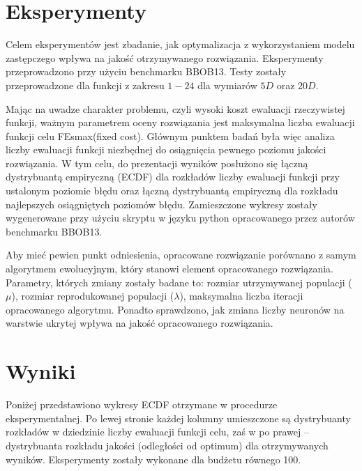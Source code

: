 \documentclass[runningheads]{llncs}
\begin{document}
\section{Eksperymenty}
Celem eksperymentów jest zbadanie, jak optymalizacja z wykorzystaniem modelu 
zastępczego wpływa na jakość otrzymywanego rozwiązania. Eksperymenty 
przeprowadzono przy użyciu benchmarku BBOB13. Testy zostały przeprowadzone dla 
funkcji z zakresu $1-24$ dla wymiarów $5D$ oraz $20D$. 

Mając na uwadze charakter problemu, czyli wysoki koszt ewaluacji rzeczywistej 
funkcji, ważnym parametrem oceny rozwiązania jest maksymalna liczba ewaluacji 
funkcji celu FEsmax(fixed cost). Głównym punktem badań była więc analiza liczby 
ewaluacji funkcji niezbędnej do osiągnięcia pewnego poziomu jakości 
rozwiązania. W tym celu, do prezentacji wyników posłużono się łączną 
dystrybuantą empiryczną (ECDF) dla rozkładów liczby ewaluacji funkcji przy 
ustalonym poziomie błędu oraz łączną dystrybuantą empiryczną dla rozkładu 
najlepszych osiągniętych poziomów błędu. Zamieszczone wykresy zostały 
wygenerowane przy użyciu skryptu w języku python opracowanego przez autorów 
benchmarku BBOB13.

Aby mieć pewien punkt odniesienia, opracowane rozwiązanie porównano z 
samym algorytmem ewolucyjnym, który stanowi element opracowanego rozwiązania. 
Parametry, których zmiany zostały badane to: rozmiar utrzymywanej populacji 
($\mu$), rozmiar reprodukowanej populacji ($\lambda$), maksymalna liczba 
iteracji opracowanego algorytmu. Ponadto sprawdzono, jak zmiana liczby 
neuronów na warstwie ukrytej wpływa na jakość opracowanego rozwiązania.

\section{Wyniki}
\newcommand{\rot}[2][2.5]{
  \hspace*{-3.5\baselineskip}%
  \begin{rotate}{90}\hspace{#1em}#2
\end{rotate}}
  
Poniżej przedstawiono wykresy ECDF otrzymane w procedurze eksperymentalnej. Po 
lewej stronie każdej kolumny umieszczone są dystrybuanty rozkładów w dziedzinie 
liczby ewaluacji funkcji celu, zaś w po prawej -- dystrybuanta rozkładu jakości 
(odległości od optimum) dla otrzymywanych wyników. Eksperymenty zostały 
wykonane dla budżetu równego 100.
\newpage  
\end{document}
